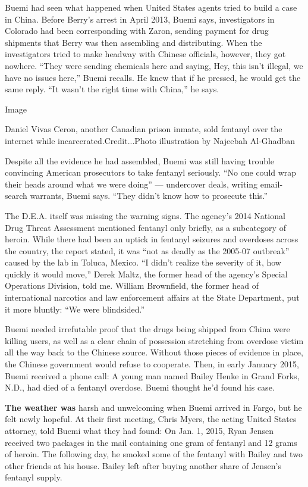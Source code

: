 Buemi had seen what happened when United States agents tried to build a
case in China. Before Berry's arrest in April 2013, Buemi says,
investigators in Colorado had been corresponding with Zaron, sending
payment for drug shipments that Berry was then assembling and
distributing. When the investigators tried to make headway with Chinese
officials, however, they got nowhere. ``They were sending chemicals here
and saying, Hey, this isn't illegal, we have no issues here,'' Buemi
recalls. He knew that if he pressed, he would get the same reply. ``It
wasn't the right time with China,'' he says.

Image

Daniel Vivas Ceron, another Canadian prison inmate, sold fentanyl over
the internet while incarcerated.Credit...Photo illustration by Najeebah
Al-Ghadban

Despite all the evidence he had assembled, Buemi was still having
trouble convincing American prosecutors to take fentanyl seriously. ``No
one could wrap their heads around what we were doing'' --- undercover
deals, writing email-search warrants, Buemi says. ``They didn't know how
to prosecute this.''

The D.E.A. itself was missing the warning signs. The agency's 2014
National Drug Threat Assessment mentioned fentanyl only briefly, as a
subcategory of heroin. While there had been an uptick in fentanyl
seizures and overdoses across the country, the report stated, it was
``not as deadly as the 2005-07 outbreak'' caused by the lab in Toluca,
Mexico. ``I didn't realize the severity of it, how quickly it would
move,'' Derek Maltz, the former head of the agency's Special Operations
Division, told me. William Brownfield, the former head of international
narcotics and law enforcement affairs at the State Department, put it
more bluntly: ``We were blindsided.''

Buemi needed irrefutable proof that the drugs being shipped from China
were killing users, as well as a clear chain of possession stretching
from overdose victim all the way back to the Chinese source. Without
those pieces of evidence in place, the Chinese government would refuse
to cooperate. Then, in early January 2015, Buemi received a phone call:
A young man named Bailey Henke in Grand Forks, N.D., had died of a
fentanyl overdose. Buemi thought he'd found his case.

\textbf{The weather was} harsh and unwelcoming when Buemi arrived in
Fargo, but he felt newly hopeful. At their first meeting, Chris Myers,
the acting United States attorney, told Buemi what they had found: On
Jan. 1, 2015, Ryan Jensen received two packages in the mail containing
one gram of fentanyl and 12 grams of heroin. The following day, he
smoked some of the fentanyl with Bailey and two other friends at his
house. Bailey left after buying another share of Jensen's fentanyl
supply.

